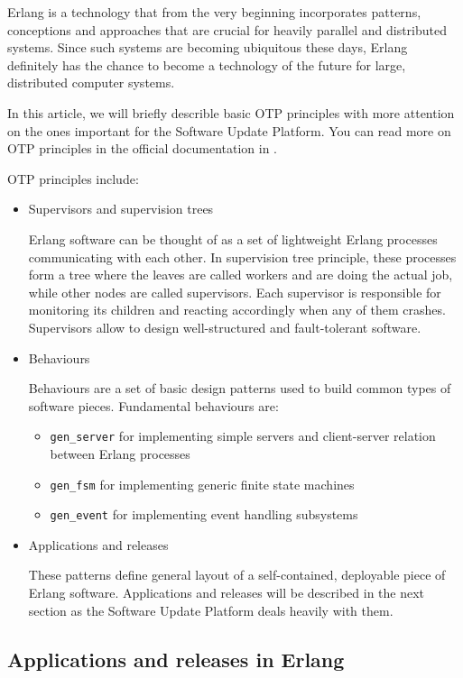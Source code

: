 Erlang is a technology that from the very beginning incorporates patterns,
conceptions and approaches that are crucial for heavily parallel and distributed systems.
Since such systems are becoming ubiquitous these days, Erlang definitely has the chance to
become a technology of the future for large, distributed computer systems.

In this article, we will briefly describle basic OTP principles with more attention on
the ones important for the Software Update Platform. You can read more on OTP principles
in the official documentation in \cite{otp}.

OTP principles include:
\begin{itemize}
\item Supervisors and supervision trees

Erlang software can be thought of as a set of lightweight Erlang processes communicating with
each other. In supervision tree principle, these processes form a tree where the leaves are
called workers and are doing the actual job, while other nodes are called supervisors.
Each supervisor is responsible for monitoring its children and reacting accordingly when
any of them crashes. Supervisors allow to design well-structured and fault-tolerant
software.

\item Behaviours

Behaviours are a set of basic design patterns used to build common types of software
pieces. Fundamental behaviours are:
\begin{itemize}
\item {\tt gen\_server} for implementing simple servers and client-server relation between Erlang
processes
\item {\tt gen\_fsm} for implementing generic finite state machines
\item {\tt gen\_event} for implementing event handling subsystems
\end{itemize}
\item Applications and releases

These patterns define general layout of a self-contained, deployable piece of Erlang
software. Applications and releases will be described in the next section as the
Software Update Platform deals heavily with them.

\end{itemize}

\subsection{Applications and releases in Erlang}

